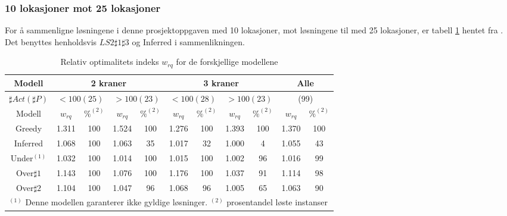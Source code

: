 \subsubsection{10 lokasjoner mot 25 lokasjoner}
For å sammenligne løsningene i denne prosjektoppgaven med 10 lokasjoner, mot løsningene til \bht med 25 lokasjoner, er tabell \ref{tab:resultaterSumTvedt} hentet fra \cite{tvedtbezem}. Det benyttes henholdsvis $LS2\sharp1\sharp3$ og Inferred i sammenlikningen.
\begin{table}[!h]
\caption{Relativ optimalitets indeks $w_{rq}$ for de forskjellige modellene}
\begin{center}
\begin{tabular}{ | c | c | c | c | c | c | c | c | c | c | c | }
\hline
\textbf{Modell} & \multicolumn{4}{|c|}{\textbf{2 kraner}} & \multicolumn{4}{|c|}{\textbf{3 kraner}} & \multicolumn{2}{|c|}{\textbf{Alle}} \\ \hline
$\sharp Act(\sharp P)$ & \multicolumn{2}{|c|}{$< 100 (25)$} & \multicolumn{2}{|c|}{$> 100 (23)$} & \multicolumn{2}{|c|}{$< 100 (28)$} & \multicolumn{2}{|c|}{$> 100 (23)$} & \multicolumn{2}{|c|}{(99)} \\ 
\hline
Modell & $w_{rq}$ & $\%^{(2)}$ & $w_{rq}$ & $\%^{(2)}$  & $w_{rq}$ & $\%^{(2)}$ & $w_{rq}$ & $\%^{(2)}$ & $w_{rq}$ & $\%^{(2)}$ \\ \hline
Greedy & 1.311 & 100 & 1.524 & 100 & 1.276 & 100 & 1.393 & 100 & 1.370 & 100 \\
Inferred & 1.068 & 100 & 1.063 & 35 & 1.017 & 32 & 1.000 & 4 & 1.055 & 43 \\
Under$^{(1)}$ & 1.032 & 100 & 1.014 & 100 & 1.015 & 100 & 1.002 & 96 & 1.016 & 99 \\
Over$\sharp 1$ & 1.143 & 100 & 1.076 & 100 & 1.176 & 100 & 1.037 & 91 & 1.114 & 98 \\
Over$\sharp 2$ & 1.104 & 100 & 1.047 & 96 & 1.068 & 96 & 1.005 & 65 & 1.063 & 90 \\
\hline
\multicolumn{11}{l}{\begin{minipage}{6in}$^{(1)}$ Denne modellen garanterer ikke gyldige løsninger.
$^{(2)}$ prosentandel løste instanser \end{minipage}}
\end{tabular}
\end{center}
\label{tab:resultaterSumTvedt}
\end{table}
